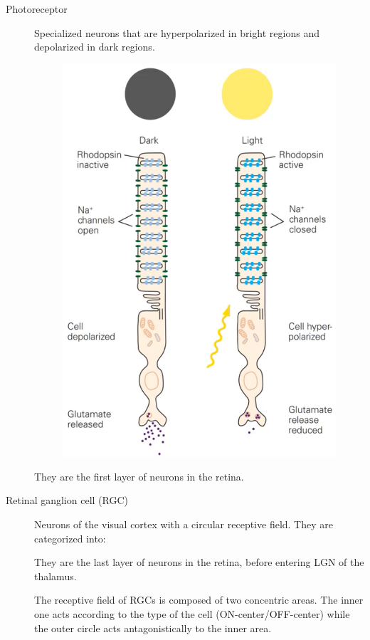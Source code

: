 \begin{description}
    \item[Photoreceptor] 
        Specialized neurons that are hyperpolarized in bright regions and depolarized in dark regions.
        \begin{figure}[H]
            \centering
            \includegraphics[width=0.3\linewidth]{./img/photoreceptor.png}
        \end{figure}

        \begin{remark}
            They are the first layer of neurons in the retina.
        \end{remark}


    \item[Retinal ganglion cell (RGC)] 
        Neurons of the visual cortex with a circular receptive field.
        They are categorized into:

        \begin{remark}
            They are the last layer of neurons in the retina, before entering LGN of the thalamus.
        \end{remark}

        The receptive field of RGCs is composed of two concentric areas. 
        The inner one acts according to the type of the cell (ON-center/OFF-center)
        while the outer circle acts antagonistically to the inner area.


\end{description}
